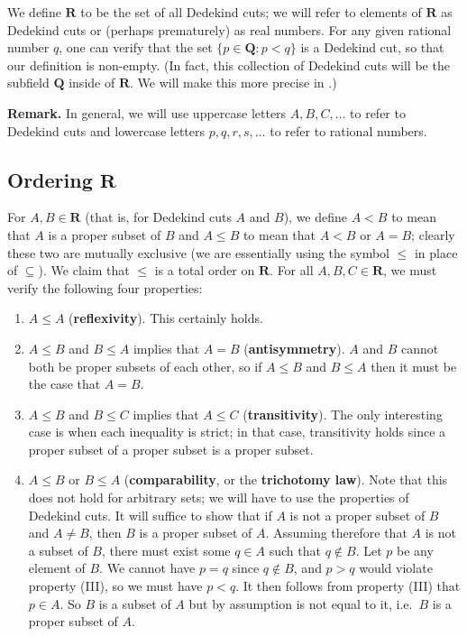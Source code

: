 \documentclass[12pt]{article}
\newcommand{\newp}{\vspace{5mm}}
\newcommand{\Q}{\mathbf{Q}}
\newcommand{\R}{\mathbf{R}}
\theoremstyle{definition}
\begin{document}
We define \( \R \) to be the set of all Dedekind cuts; we will refer to elements of \( \R \) as Dedekind cuts or (perhaps prematurely) as real numbers. For any given rational number \( q \), one can verify that the set \( \{ p \in \Q : p < q \} \) is a Dedekind cut, so that our definition is non-empty. (In fact, this collection of Dedekind cuts will be the subfield \( \Q \) inside of \( \R \). We will make this more precise in .)

\newp

\textbf{Remark.} In general, we will use uppercase letters \( A, B, C, \ldots \) to refer to Dedekind cuts and lowercase letters \( p, q, r, s, \ldots \) to refer to rational numbers.

\subsection{Ordering \texorpdfstring{\(\R\)}{}}
\label{sec:ordering_R}

For \( A, B \in \R \) (that is, for Dedekind cuts \( A \) and \( B \)), we define \( A < B \) to mean that \( A \) is a proper subset of \( B \) and \( A \leq B \) to mean that \( A < B \) or \( A = B \); clearly these two are mutually exclusive (we are essentially using the symbol \( \leq \) in place of \( \subseteq \)). We claim that \( \leq \) is a total order on \( \R \). For all \( A, B, C \in \R \), we must verify the following four properties:

\begin{enumerate}[label = (O\arabic*)]
    \item \( A \leq A \) (\textbf{reflexivity}). This certainly holds.
    
    \item \( A \leq B \) and \( B \leq A \) implies that \( A = B \) (\textbf{antisymmetry}). \( A \) and \( B \) cannot both be proper subsets of each other, so if \( A \leq B \) and \( B \leq A \) then it must be the case that \( A = B \).
    
    \item \( A \leq B \) and \( B \leq C \) implies that \( A \leq C \) (\textbf{transitivity}). The only interesting case is when each inequality is strict; in that case, transitivity holds since a proper subset of a proper subset is a proper subset.
    
    \item \( A \leq B \) or \( B \leq A \) (\textbf{comparability}, or the \textbf{trichotomy law}). Note that this does not hold for arbitrary sets; we will have to use the properties of Dedekind cuts. It will suffice to show that if \( A \) is not a proper subset of \( B \) and \( A \neq B \), then \( B \) is a proper subset of \( A \). Assuming therefore that \( A \) is not a subset of \( B \), there must exist some \( q \in A \) such that \( q \not\in B \). Let \( p \) be any element of \( B \). We cannot have \( p = q \) since \( q \not\in B \), and \( p > q \) would violate property (III), so we must have \( p < q \). It then follows from property (III) that \( p \in A \). So \( B \) is a subset of \( A \) but by assumption is not equal to it, i.e.\ \( B \) is a proper subset of \( A \).
\end{enumerate}
\end{document}
